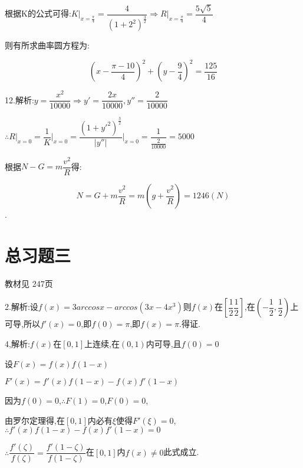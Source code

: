 根据K的公式可得:$K{|_{x = \frac{\pi }{4}}} = \dfrac{4}{{{{(1 + {2^2})}^{\frac{3}{2}}}}} \Rightarrow R{|_{x = \frac{\pi }{4}}} = \dfrac{{5\sqrt 5 }}{4}$

则有所求曲率圆方程为:

\[{(x - \dfrac{{\pi  - 10}}{4})^2} + {(y - \dfrac{9}{4})^2} = \dfrac{{125}}{{16}}\]

12.解析:$y = \dfrac{{{x^2}}}{{10000}} \Rightarrow y' = \dfrac{{2x}}{{10000}},y'' = \dfrac{2}{{10000}}$

$\therefore R{|_{x = 0}} = \dfrac{1}{K}{|_{x = 0}} = \dfrac{{{{(1 + {{y'}^2})}^{\frac{3}{2}}}}}{{|y''|}}{|_{x = 0}} = \dfrac{1}{{\frac{2}{{10000}}}} = 5000$

根据$N - G = m\dfrac{{{v^2}}}{R}$得:

\[N = G + m\dfrac{{{v^2}}}{R} = m(g + \dfrac{{{v^2}}}{R}) = 1246(N)\].



\section{总习题三}
\begin{flushright}
  \color{zhanqing!80}
  \color{zhanqing!80}
   教材见 247页 %
\end{flushright}

2.解析:设$f(x) = 3arccos x - arccos(3x - 4x^3)$则$f(x)$在$\left[  \dfrac{1}{2}\dfrac{1}{2} \right]$,在$\left( { - \dfrac{1}{2},\dfrac{1}{2}} \right)$上可导,所以$f'\left( x \right) = 0$,即$f\left( 0 \right) = \pi $,即$f\left( x \right) = \pi $.得证.

4,解析:$f(x)$在$[0,1]$上连续,在$(0,1)$内可导,且$f\left( 0 \right) = 0 $

设$F\left( x \right) = f\left( x \right)f\left( {1 - x} \right)$

$F'\left( x \right) = f'\left( x \right)f\left( {1 - x} \right) - f\left( x \right)f'\left( {1 - x} \right)$

因为$f\left( 0 \right) = 0 $,$\therefore F\left( 1 \right) = 0 $,$F\left( 0 \right) = 0 $,

由罗尔定理得,在$[0,1]$内必有$\xi $使得$F'\left( \xi  \right) = 0$,$\therefore f'\left( x \right)f\left( {1 - x} \right) - f\left( x \right)f'\left( {1 - x} \right) = 0$

$\therefore \dfrac{{f'\left( \zeta  \right)}}{{f\left( \zeta  \right)}} = \dfrac{{f'\left( {1 - \zeta } \right)}}{{f\left( {1 - \zeta } \right)}}$在$[0,1]$内$f(x) \ne 0$此式成立.

